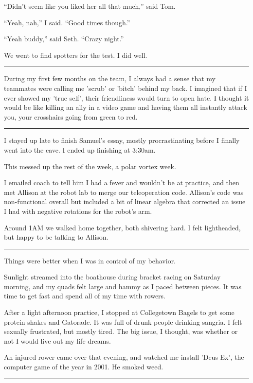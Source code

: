 ``Didn't seem like you liked her all that much,'' said Tom.

``Yeah, nah,'' I said.  ``Good times though.''

``Yeah buddy,'' said Seth.  ``Crazy night.'' 

We went to find spotters for the test.  I did well.

\plainfancybreak{12pt}{2}{}

During my first few months on the team, I always had a sense that my teammates
were calling me 'scrub' or 'bitch' behind my back.  I imagined that if I ever
showed my 'true self', their friendliness would turn to open hate.  I thought it
would be like killing an ally in a video game and having them all instantly
attack you, your crosshairs going from green to red. 

\plainfancybreak{12pt}{2}{}

I stayed up late to finish Samuel's essay, mostly procrastinating before I
finally went into the cave.  I ended up finishing at 3:30am.

This messed up the rest of the week, a polar vortex week.

I emailed coach to tell him I had a fever and wouldn't be at practice, and then
met Allison at the robot lab to merge our teleoperation code.   Allison's code
was non-functional overall but included a bit of linear algebra that corrected
an issue I had with negative rotations for the robot's arm.

Around 1AM we walked home together, both shivering hard.  I felt lightheaded,
but happy to be talking to Allison. 

\plainfancybreak{12pt}{2}{}

Things were better when I was in control of my behavior.

Sunlight streamed into the boathouse during bracket racing on Saturday morning,
and my quads felt large and hammy as I paced between pieces.  It was time to get
fast and spend all of my time with rowers.  

After a light afternoon practice, I stopped at Collegetown Bagels to get some
protein shakes and Gatorade.  It was full of drunk people drinking sangria.  I
felt sexually frustrated, but mostly tired.  The big issue, I thought, was
whether or not I would live out my life dreams.

An injured rower came over that evening, and watched me install 'Deus Ex', the
computer game of the year in 2001.  He smoked weed.

\plainfancybreak{12pt}{2}{}

